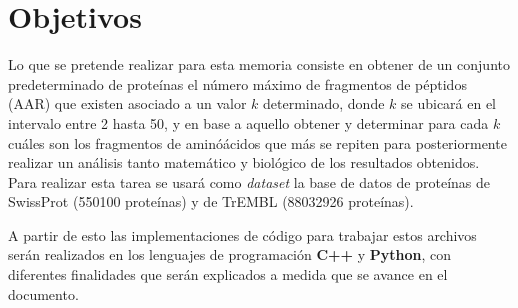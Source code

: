 \section{Objetivos}

Lo que se pretende realizar para esta memoria consiste en obtener de un conjunto predeterminado de proteínas el número máximo de fragmentos de péptidos (AAR) que existen asociado a un valor $k$ determinado, donde $k$ se ubicará en el intervalo entre 2 hasta 50, y en base a aquello obtener y determinar para cada $k$ cuáles son los fragmentos de aminóácidos que más se repiten para posteriormente realizar un análisis tanto matemático y biológico de los resultados obtenidos. Para realizar esta tarea se usará como \textit{dataset} la base de datos de proteínas de SwissProt (550100 proteínas) y de TrEMBL (88032926 proteínas).

A partir de esto las implementaciones de código para trabajar estos archivos serán realizados en los lenguajes de programación {\textbf{C++}} y {\textbf{Python}}, con diferentes finalidades que serán explicados a medida que se avance en el documento.